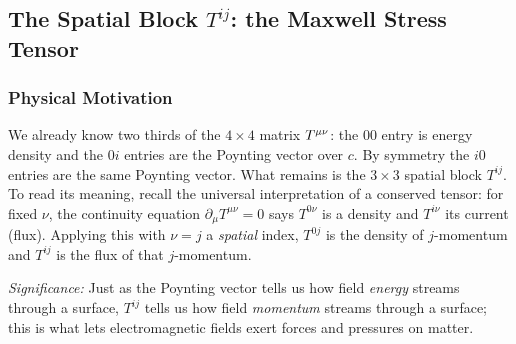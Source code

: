 \subsection{The Spatial Block $T^{ij}$: the Maxwell Stress Tensor}
\label{subsec:lec24:stress}

\subsubsection*{Physical Motivation}
We already know two thirds of the $4\times4$ matrix $T^{\mu\nu}$: the $00$ entry is energy
density and the $0i$ entries are the Poynting vector over $c$. By symmetry the $i0$ entries
are the same Poynting vector. What remains is the $3\times3$ spatial block $T^{ij}$. To read
its meaning, recall the universal interpretation of a conserved tensor: for fixed $\nu$, the
continuity equation $\partial_\mu T^{\mu\nu}=0$ says $T^{0\nu}$ is a density and $T^{i\nu}$
its current (flux). Applying this with $\nu=j$ a \emph{spatial} index, $T^{0j}$ is the
density of $j$-momentum and $T^{ij}$ is the flux of that $j$-momentum.


\textit{Significance:} Just as the Poynting vector tells us how field \emph{energy} streams
through a surface, $T^{ij}$ tells us how field \emph{momentum} streams through a surface;
this is what lets electromagnetic fields exert forces and pressures on matter.

